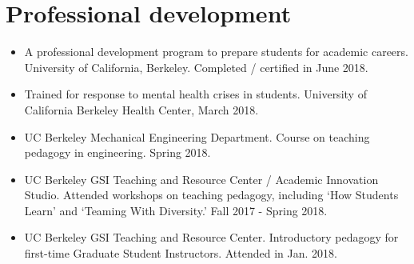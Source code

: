 \documentclass[letterpaper]{deedy-resume} %
\begin{document}
{{%
  
  



\vspace{0.2cm}
\section{Professional development}
\vspace{0.2cm}

\begin{itemize}

\item {} A professional development program to prepare students for academic careers. University of California, Berkeley. Completed / certified in June 2018.
  
\item {} Trained for response to mental health crises in students. University of California Berkeley Health Center, March 2018.

\item {} UC Berkeley Mechanical Engineering Department. Course on teaching pedagogy in engineering. Spring 2018.
  
\item {} UC Berkeley GSI Teaching and Resource Center / Academic Innovation Studio. Attended workshops on teaching pedagogy, including `How Students Learn' and `Teaming With Diversity.' Fall 2017 - Spring 2018.

\item {} UC Berkeley GSI Teaching and Resource Center. Introductory pedagogy for first-time Graduate Student Instructors. Attended in Jan. 2018.


\end{itemize}}}
\end{document}
